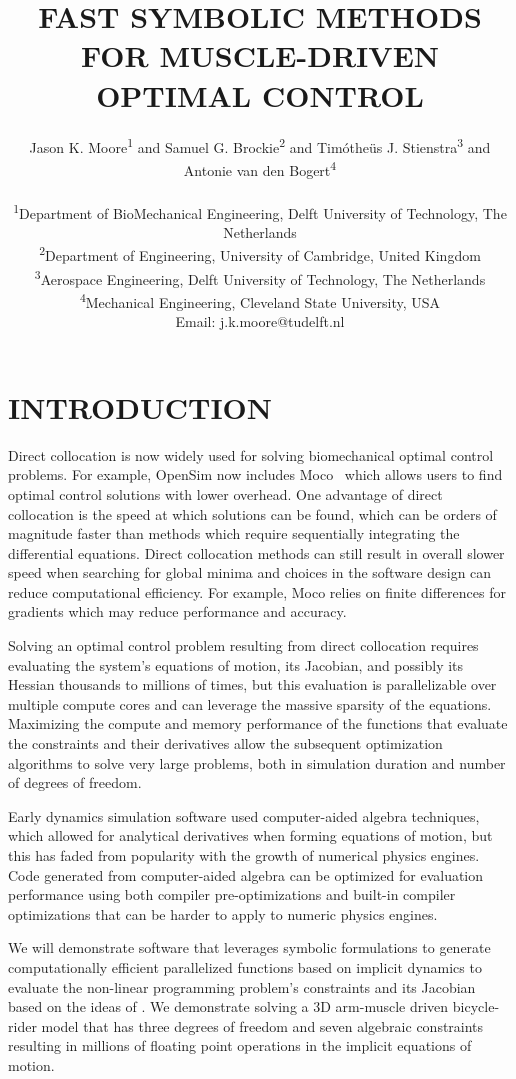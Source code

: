 \documentclass[11pt,twocolumn]{article}
\title{\normalsize\textbf{
  FAST SYMBOLIC METHODS FOR MUSCLE-DRIVEN OPTIMAL CONTROL
}}
\author{
Jason K. Moore\textsuperscript{1} and
Samuel G. Brockie\textsuperscript{2} and
Timótheüs J. Stienstra\textsuperscript{3} and
Antonie van den Bogert\textsuperscript{4} \\
\\
\small
\textsuperscript{1}Department of BioMechanical Engineering, Delft University of Technology, The Netherlands\\
\small
\textsuperscript{2}Department of Engineering, University of Cambridge, United Kingdom\\
\small
\textsuperscript{3}Aerospace Engineering, Delft University of Technology, The Netherlands\\
\small
\textsuperscript{4}Mechanical Engineering, Cleveland State University, USA\\
\small
Email: j.k.moore@tudelft.nl}
\date{}
\begin{document}
\pagestyle{fancy}
\lhead{}
\fancyfoot{}
\maketitle
\section*{INTRODUCTION}
\vspace{-1em}
%
Direct collocation is now widely used for solving biomechanical optimal control
problems. For example, OpenSim now includes Moco~\cite{Dembia2020} which allows
users to find optimal control solutions with lower overhead. One advantage of
direct collocation is the speed at which solutions can be found, which can be
orders of magnitude faster than methods which require sequentially integrating
the differential equations. Direct collocation methods can still result in
overall slower speed when searching for global minima and choices in the
software design can reduce computational efficiency. For example, Moco relies on
finite differences for gradients which may reduce performance and accuracy.

Solving an optimal control problem resulting from direct collocation requires
evaluating the system's equations of motion, its Jacobian, and possibly its
Hessian thousands to millions of times, but this evaluation is parallelizable
over multiple compute cores and can leverage the massive sparsity of the
equations. Maximizing the compute and memory performance of the functions that
evaluate the constraints and their derivatives allow the subsequent
optimization algorithms to solve very large problems, both in simulation
duration and number of degrees of freedom.

Early dynamics simulation software used computer-aided algebra techniques, which
allowed for analytical derivatives when forming equations of motion, but this
has faded from popularity with the growth of numerical physics engines. Code
generated from computer-aided algebra can be optimized for evaluation
performance using both compiler pre-optimizations and built-in compiler
optimizations that can be harder to apply to numeric physics engines.

We will demonstrate software that leverages symbolic formulations to generate
computationally efficient parallelized functions based on implicit dynamics to
evaluate the non-linear programming problem's constraints and its Jacobian based
on the ideas of \cite{vandenBogert2011a}. We demonstrate solving a 3D arm-muscle
driven bicycle-rider model that has three degrees of freedom and seven algebraic
constraints resulting in millions of floating point operations in the implicit
equations of motion.
\end{document}
